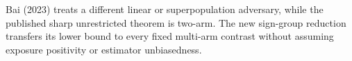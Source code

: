 Bai (2023) treats a different linear or superpopulation adversary, while the published sharp unrestricted theorem is two-arm.  The new sign-group reduction transfers its lower bound to every fixed multi-arm contrast without assuming exposure positivity or estimator unbiasedness.